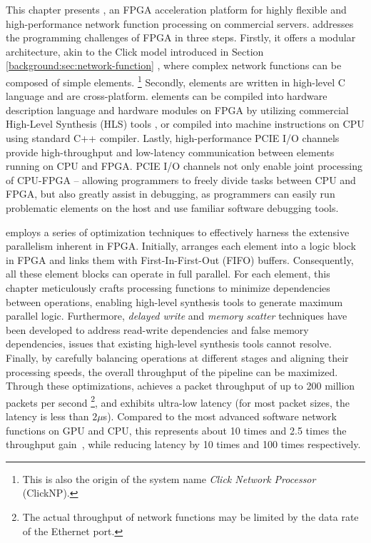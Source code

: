 This chapter presents \name{}, an FPGA acceleration platform for highly flexible and high-performance network function processing on commercial servers.
\name{} addresses the programming challenges of FPGA in three steps.
Firstly, it offers a modular architecture, akin to the Click model introduced in Section \ref{background:sec:network-function} \cite {kohler2000click}, where complex network functions can be composed of simple elements.
\footnote{This is also the origin of the system name \textit{Click Network Processor} (ClickNP).}
Secondly, \name{} elements are written in high-level C language and are cross-platform.
\name{} elements can be compiled into hardware description language and hardware modules on FPGA by utilizing commercial High-Level Synthesis (HLS) tools \cite {vivado,aoc,sdaccel}, or compiled into machine instructions on CPU using standard C++ compiler.
Lastly, high-performance PCIE I/O channels provide high-throughput and low-latency communication between elements running on CPU and FPGA.
PCIE I/O channels not only enable joint processing of CPU-FPGA -- allowing programmers to freely divide tasks between CPU and FPGA, but also greatly assist in debugging, as programmers can easily run problematic elements on the host and use familiar software debugging tools.

\name{} employs a series of optimization techniques to effectively harness the extensive parallelism inherent in FPGA. Initially, \name{} arranges each element into a logic block in FPGA and links them with First-In-First-Out (FIFO) buffers. Consequently, all these element blocks can operate in full parallel. For each element, this chapter meticulously crafts processing functions to minimize dependencies between operations, enabling high-level synthesis tools to generate maximum parallel logic. Furthermore, \textit{delayed write} and \textit{memory scatter} techniques have been developed to address read-write dependencies and false memory dependencies, issues that existing high-level synthesis tools cannot resolve. Finally, by carefully balancing operations at different stages and aligning their processing speeds, the overall throughput of the pipeline can be maximized. Through these optimizations, \name{} achieves a packet throughput of up to 200 million packets per second \footnote{The actual throughput of \name{} network functions may be limited by the data rate of the Ethernet port.}, and exhibits ultra-low latency (for most packet sizes, the latency is less than $2 \mu$s). Compared to the most advanced software network functions on GPU and CPU, this represents about 10 times and 2.5 times the throughput gain~\cite{packetshader}, while reducing latency by 10 times and 100 times respectively.

